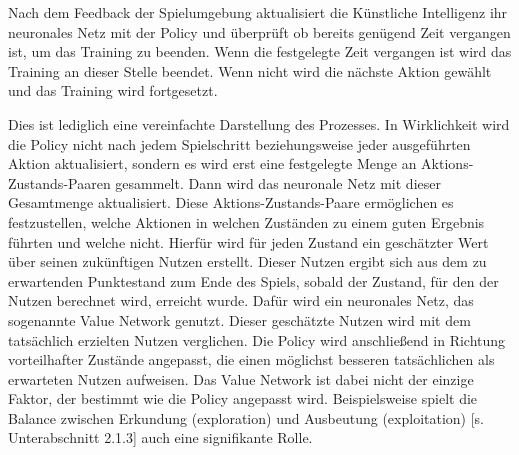 Nach dem Feedback der Spielumgebung aktualisiert die Künstliche Intelligenz ihr neuronales Netz mit der Policy und überprüft ob bereits genügend Zeit vergangen ist, um das Training zu beenden. Wenn die festgelegte Zeit vergangen ist wird das Training an dieser Stelle beendet. Wenn nicht wird die nächste Aktion gewählt und das Training wird fortgesetzt.

Dies ist lediglich eine vereinfachte Darstellung des Prozesses. In Wirklichkeit wird die Policy nicht nach jedem Spielschritt beziehungsweise jeder ausgeführten Aktion aktualisiert, sondern es wird erst eine festgelegte Menge an Aktions-Zustands-Paaren gesammelt. Dann wird das neuronale Netz mit dieser Gesamtmenge aktualisiert. Diese Aktions-Zustands-Paare ermöglichen es festzustellen, welche Aktionen in welchen Zuständen zu einem guten Ergebnis führten und welche nicht. Hierfür wird für jeden Zustand ein geschätzter Wert über seinen zukünftigen Nutzen erstellt. Dieser Nutzen ergibt sich aus dem zu erwartenden Punktestand zum Ende des Spiels, sobald der Zustand, für den der Nutzen berechnet wird, erreicht wurde. Dafür wird ein neuronales Netz, das sogenannte Value Network genutzt. Dieser geschätzte Nutzen wird mit dem tatsächlich erzielten Nutzen verglichen. Die Policy wird anschließend in Richtung vorteilhafter Zustände angepasst, die einen möglichst besseren tatsächlichen als erwarteten Nutzen aufweisen. Das Value Network ist dabei nicht der einzige Faktor, der bestimmt wie die Policy angepasst wird. Beispielsweise spielt die Balance zwischen Erkundung (exploration) und Ausbeutung (exploitation) [s. Unterabschnitt 2.1.3] auch eine signifikante Rolle.
